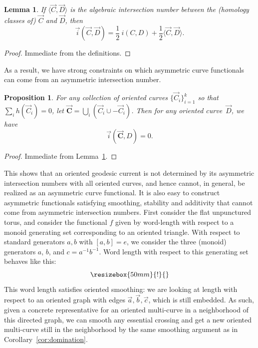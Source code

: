 \documentclass[11pt]{amsart}
\newcommand*{\svgfig}[1]{\Huge{}}
\numberwithin{equation}{section}
\numberwithin{figure}{section}
\newtheorem{lemma}[theorem]{Lemma}
\newtheorem{proposition}[theorem]{Proposition}
\theoremstyle{definition}
\theoremstyle{plain}
\begin{document}
\begin{lemma}\label{lem:asym-intersect}
  If $\langle \vec C, \vec D\rangle$ is the algebraic intersection
  number between the (homology classes of) $\vec C$ and $\vec D$, then
  \[
    \vec i(\vec C, \vec D) = {\textstyle\frac12}\ i(C, D) + {\textstyle\frac12}\langle \vec C,\vec D\rangle.
  \]
\end{lemma}

\begin{proof}
  Immediate from the definitions.
\end{proof}

As a result, we have strong constraints on which asymmetric curve
functionals can come from an asymmetric intersection number.

\begin{proposition}\label{prop:asym-constraint}
  For any collection of oriented curves $\{\vec C_i\}_{i=1}^k$ so that
  $\sum_i h(\vec C_i) = 0$, let $\vec{\mathbf{C}} = \bigcup_i (\vec C_i
  \cup -\vec C_i)$. Then for any oriented curve~$\vec D$, we have
  \[
    \vec i(\vec{\mathbf C}, D) = 0.
  \]
\end{proposition}
\begin{proof}
  Immediate from Lemma~\ref{lem:asym-intersect}.
\end{proof}

This shows that an oriented geodesic current is not determined by its asymmetric intersection numbers with all oriented curves, and hence cannot, in general, be realized as an asymmetric curve functional.
It is also easy to construct asymmetric functionals satisfying smoothing, stability and additivity that cannot come
from asymmetric intersection numbers. First consider the flat unpunctured torus,
and consider the functional $f$ given by word-length with respect
to a monoid generating set corresponding to an oriented triangle. With
respect to standard generators $a,b$ with $[a,b] = e$, we consider the
three (monoid) generators $a$, $b$, and $c = a^{-1}b^{-1}$. Word length with
respect to this generating set behaves like this:
\[
  \resizebox{50mm}{!}{\svgfig{length_asymmetric}}
\]
This word length satisfies oriented smoothing: we are looking at
length with respect to an oriented graph with edges $\vec a, \vec b, \vec c$, which is still embedded. As
such, given a concrete representative for an oriented multi-curve in
a neighborhood of this directed graph, we can smooth any essential
crossing and get a new oriented multi-curve still in the neighborhood by the same smoothing argument as in Corollary~\ref{cor:domination}.
\end{document}
